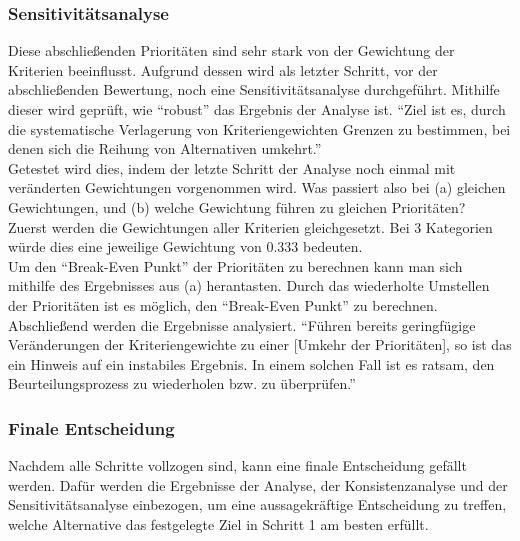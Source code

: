 \subsubsection{Sensitivitätsanalyse}
Diese abschließenden Prioritäten sind sehr stark von der Gewichtung der Kriterien beeinflusst.\autocite[Vgl.][S.19]{Mu.2018} Aufgrund dessen wird als letzter Schritt, vor der abschließenden Bewertung, noch eine Sensitivitätsanalyse durchgeführt. Mithilfe dieser wird geprüft, wie \enquote{robust} das Ergebnis der Analyse ist.\autocite[Vgl.][S.20]{Mu.2018} \enquote{Ziel ist es, durch die systematische Verlagerung von Kriteriengewichten Grenzen zu bestimmen, bei denen sich die Reihung von Alternativen umkehrt.}\autocite[S.111]{Fink.2006}\\ 
Getestet wird dies, indem der letzte Schritt der Analyse noch einmal mit veränderten Gewichtungen vorgenommen wird. Was passiert also bei (a) gleichen Gewichtungen, und (b) welche Gewichtung führen zu gleichen Prioritäten?\autocite[Vgl.][S.20]{Mu.2018}\\
Zuerst werden die Gewichtungen aller Kriterien gleichgesetzt. Bei 3 Kategorien würde dies eine jeweilige Gewichtung von $0.333$ bedeuten.\\
Um den \enquote{Break-Even Punkt}\autocite[S.21]{Mu.2018} der Prioritäten zu berechnen kann man sich mithilfe des Ergebnisses aus (a) herantasten. Durch das wiederholte Umstellen der Prioritäten ist es möglich, den \enquote{Break-Even Punkt} zu berechnen. Abschließend werden die Ergebnisse analysiert. \enquote{Führen bereits geringfügige Veränderungen der Kriteriengewichte zu einer [Umkehr der Prioritäten], so ist das ein Hinweis auf ein instabiles Ergebnis. In einem solchen Fall ist es ratsam, den Beurteilungsprozess zu wiederholen bzw. zu überprüfen.}\autocite[S.111]{Fink.2006}
\subsubsection{Finale Entscheidung}
Nachdem alle Schritte vollzogen sind, kann eine finale Entscheidung gefällt werden. Dafür werden die Ergebnisse der Analyse, der Konsistenzanalyse und der Sensitivitätsanalyse einbezogen, um eine aussagekräftige Entscheidung zu treffen, welche Alternative das festgelegte Ziel in Schritt 1 am besten erfüllt.

